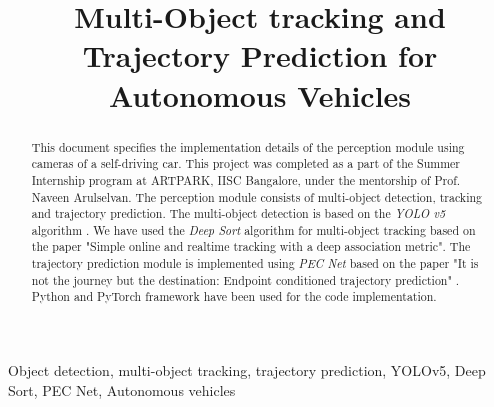 \documentclass[conference]{IEEEtran}
\begin{document}
\title{Multi-Object tracking and Trajectory Prediction for Autonomous Vehicles\\
}

\author{
  \and
}

\maketitle

\begin{abstract}
  This document specifies the implementation details of the perception module using cameras of a self-driving car. This project was completed as a part of the Summer Internship program at ARTPARK, IISC Bangalore, under the mentorship of Prof. Naveen Arulselvan. The perception module consists of multi-object detection, tracking and trajectory prediction. The multi-object detection is based on the \textit{YOLO v5} algorithm{} \cite{YOLOv5}. We have used the \textit{ Deep Sort} algorithm for multi-object tracking based on the paper "Simple online and realtime tracking with a deep association metric". The trajectory prediction module is implemented using \textit{PEC Net} based on the paper "It is not the journey but the destination: Endpoint conditioned trajectory prediction" \cite{PECNET}. Python and PyTorch framework have been used for the code implementation.
\end{abstract}

\begin{IEEEkeywords}
  Object detection, multi-object tracking, trajectory prediction, YOLOv5, Deep Sort, PEC Net, Autonomous vehicles
\end{IEEEkeywords}
\end{document}
